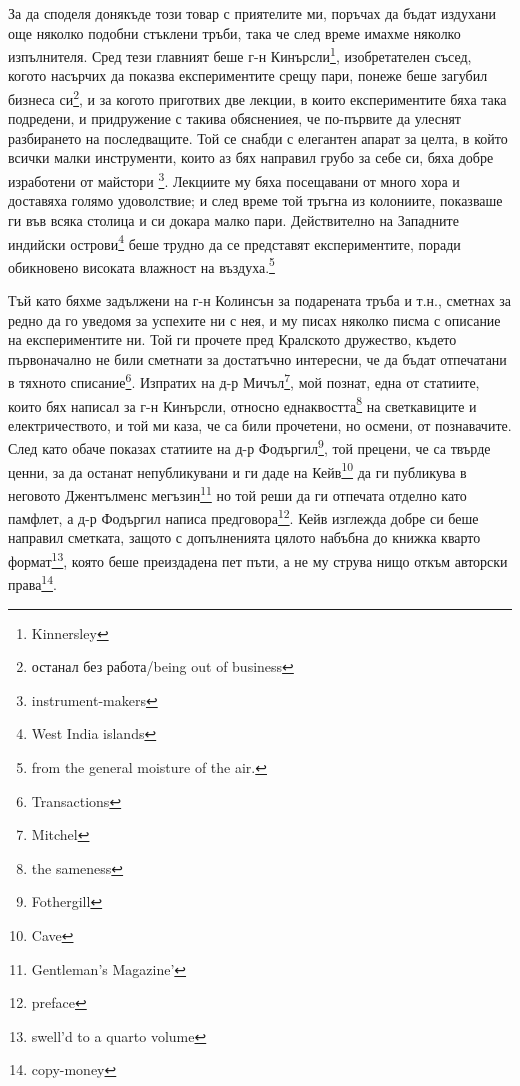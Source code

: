 \documentclass[12pt]{book}
\begin{document}
За да споделя донякъде този товар с приятелите ми, поръчах да бъдат издухани още няколко подобни стъклени тръби, така че след време имахме няколко изпълнителя. Сред тези главният беше г-н Кинърсли\footnote{Kinnersley}, изобретателен съсед, когото насърчих да показва експериментите срещу пари, понеже беше загубил бизнеса си\footnote{останал без работа/being out of business}, и за когото приготвих две лекции, в които експериментите бяха така подредени, и придружение с такива обяснениея, че по-първите да улеснят разбирането на последващите. Той се снабди с елегантен апарат за целта, в който всички малки инструменти, които аз бях направил грубо за себе си, бяха добре изработени от майстори \footnote{instrument-makers}. Лекциите му бяха посещавани от много хора и доставяха голямо удоволствие; и след време той тръгна из колониите, показваше ги във всяка столица и си докара малко пари. Действително на Западните индийски острови\footnote{West India islands} беше трудно да се представят експериментите, поради обикновено високата влажност на въздуха.\footnote{from the general moisture of the air.}

Тъй като бяхме задължени на г-н Колинсън за подарената тръба и т.н., сметнах за редно да го уведомя за успехите ни с нея, и му писах няколко писма с описание на експериментите ни. Той ги прочете пред Кралското дружество, където първоначално не били сметнати за достатъчно интересни, че да бъдат отпечатани в тяхното списание\footnote{Transactions}. Изпратих на д-р Мичъл\footnote{Mitchel}, мой познат, една от статиите, които бях написал за г-н Кинърсли, относно еднаквостта\footnote{the sameness} на светкавиците и електричеството, и той ми каза, че са били прочетени, но осмени, от познавачите. След като обаче показах статиите на д-р Фодъргил\footnote{Fothergill}, той прецени, че са твърде ценни, за да останат непубликувани и ги даде на Кейв\footnote{Cave} да ги публикува в неговото Джентълменс мегъзин\footnote{Gentleman's Magazine'} но той реши да ги отпечата отделно като памфлет, а д-р Фодъргил написа предговора\footnote{preface}. Кейв изглежда добре си беше направил сметката, защото с допълненията цялото набъбна до книжка кварто формат\footnote{swell'd to a quarto volume}, която беше преиздадена пет пъти, а не му струва нищо откъм авторски права\footnote{copy-money}.
\end{document}
